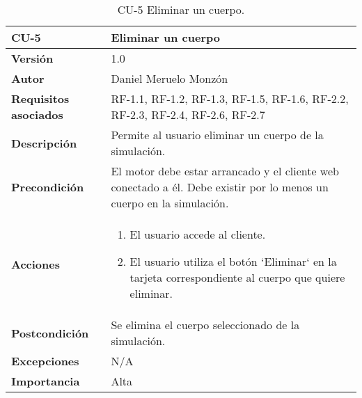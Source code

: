 \begin{table}[p]
	\centering
	\begin{tabularx}{\linewidth}{ p{} p{} }
		\toprule
		\textbf{CU-5}    & \textbf{Eliminar un cuerpo}\\
		\toprule
		\textbf{Versión}              & 1.0    \\
		\textbf{Autor}                & Daniel Meruelo Monzón \\
		\textbf{Requisitos asociados} & RF-1.1, RF-1.2, RF-1.3, RF-1.5, RF-1.6, RF-2.2, RF-2.3, RF-2.4, RF-2.6, RF-2.7 \\
		\textbf{Descripción}          & Permite al usuario eliminar un cuerpo de la simulación. \\
		\textbf{Precondición}         & El motor debe estar arrancado y el cliente web conectado a él. Debe existir por lo menos un cuerpo en la simulación. \\
		\textbf{Acciones}             &
		\begin{enumerate}
			\def\labelenumi{\arabic{enumi}.}
			\tightlist
			\item El usuario accede al cliente.
			\item El usuario utiliza el botón `Eliminar` en la tarjeta correspondiente al cuerpo que quiere eliminar.
		\end{enumerate}\\
		\textbf{Postcondición}        & Se elimina el cuerpo seleccionado de la simulación.\\
		\textbf{Excepciones}          & N/A \\
		\textbf{Importancia}          & Alta\\
		\bottomrule
	\end{tabularx}
	\caption{CU-5 Eliminar un cuerpo.}
\end{table}
